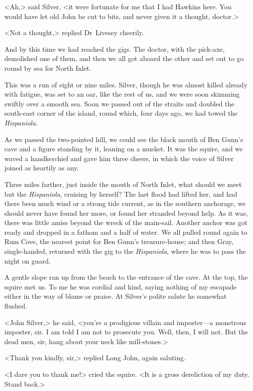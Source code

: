 <Ah,> said Silver, <it were fortunate for me that I had Hawkins here. You would have let old John be cut to bits, and never given it a thought, doctor.>

<Not a thought,> replied Dr~Livesey cheerily.

And by this time we had reached the gigs. The doctor, with the pick-axe, demolished one of them, and then we all got aboard the other and set out to go round by sea for North Inlet.

This was a run of eight or nine miles. Silver, though he was almost killed already with fatigue, was set to an oar, like the rest of us, and we were soon skimming swiftly over a smooth sea. Soon we passed out of the straits and doubled the south-east corner of the island, round which, four days ago, we had towed the \textit{Hispaniola}.

As we passed the two-pointed hill, we could see the black mouth of Ben Gunn's cave and a figure standing by it, leaning on a musket. It was the squire, and we waved a handkerchief and gave him three cheers, in which the voice of Silver joined as heartily as any.

Three miles farther, just inside the mouth of North Inlet, what should we meet but the \textit{Hispaniola}, cruising by herself? The last flood had lifted her, and had there been much wind or a strong tide current, as in the southern anchorage, we should never have found her more, or found her stranded beyond help. As it was, there was little amiss beyond the wreck of the main-sail. Another anchor was got ready and dropped in a fathom and a half of water. We all pulled round again to Rum Cove, the nearest point for Ben Gunn's treasure-house; and then Gray, single-handed, returned with the gig to the \textit{Hispaniola}, where he was to pass the night on guard.

A gentle slope ran up from the beach to the entrance of the cave. At the top, the squire met us. To me he was cordial and kind, saying nothing of my escapade either in the way of blame or praise. At Silver's polite salute he somewhat flushed.

<John Silver,> he said, <you're a prodigious villain and imposter—a monstrous imposter, sir. I am told I am not to prosecute you. Well, then, I will not. But the dead men, sir, hang about your neck like mill-stones.>

<Thank you kindly, sir,> replied Long John, again saluting.

<I dare you to thank me!> cried the squire. <It is a gross dereliction of my duty. Stand back.>

